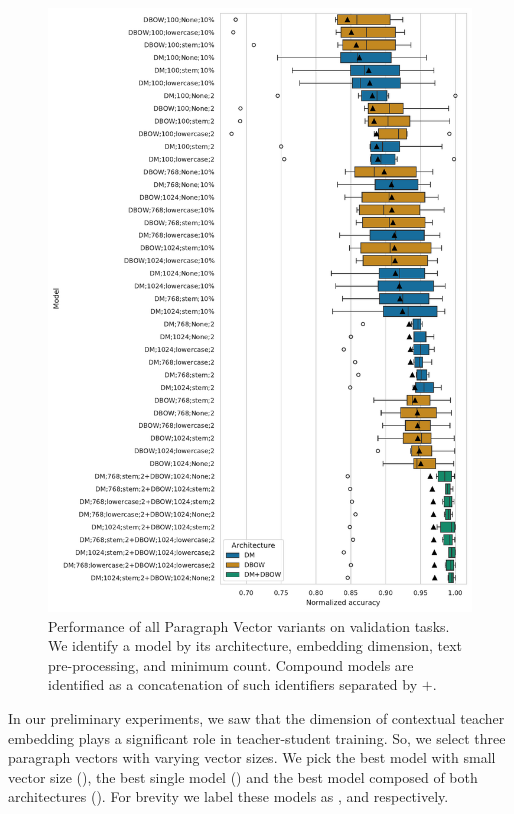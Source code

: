 \begin{figure}

    \includegraphics[width=\textwidth]{./img/pv_val_scores.pdf}

    \caption{Performance of all Paragraph Vector variants on validation tasks.
    We identify a model by its architecture, embedding dimension, text
    pre-processing, and minimum count. Compound models are identified as a concatenation of such identifiers separated
    by $+$.}

    \label{fig:pv_val_scores}

\end{figure}

In our preliminary experiments, we saw that the dimension of contextual
teacher embedding plays a significant role in teacher-student training.
So, we select three paragraph vectors with varying vector sizes. We pick the
best model with small vector size (), the best
single model () and the best model composed of both
architectures (). For brevity we label
these models as ,  and  respectively.

